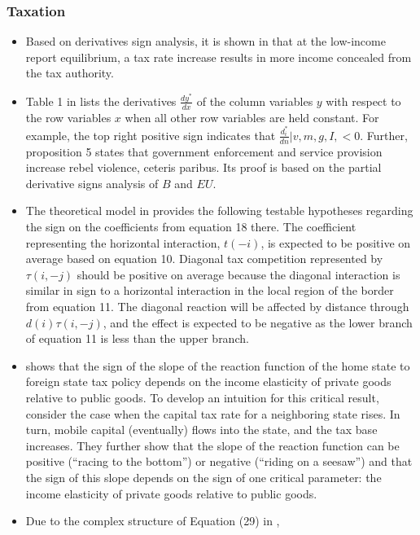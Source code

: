 \documentclass[11pt]{book}
\begin{document}
\subsubsection{Taxation}
\begin{itemize}
\item Based on derivatives sign analysis, it is shown in \cite{panades2004tax}
that at the low-income report equilibrium, a tax rate increase results
in more income concealed from the tax authority.
\item Table 1 in \cite{berman2013predation}
lists the derivatives $\frac{dy^{*}}{dx}$ of the column variables
$y$ with respect to the row variables $x$ when all other row variables
are held constant. For example, the top right positive sign indicates
that $\frac{d_{i}^{*}}{dn}|v,m,g,I,<0$. Further, proposition 5 states
that government enforcement and service provision increase rebel violence,
ceteris paribus. Its proof is based on the partial derivative signs
analysis of $B$ and $EU$.
\item The theoretical model in \cite{agrawal2015inter}
provides the following testable hypotheses regarding the sign on the
coefficients from equation 18 there. The coefficient representing
the horizontal interaction, $t\left(-i\right)$, is expected to be
positive on average based on equation 10. Diagonal tax competition
represented by $\tau\left(i,-j\right)$ should be positive on average
because the diagonal interaction is similar in sign to a horizontal
interaction in the local region of the border from equation 11. The
diagonal reaction will be affected by distance through $d\left(i\right)\tau\left(i,-j\right)$,
and the effect is expected to be negative as the lower branch of equation
11 is less than the upper branch.
\item \cite{chirinko2017tax}
shows that the sign of the slope of the reaction function of the home
state to foreign state tax policy depends on the income elasticity
of private goods relative to public goods. To develop an intuition
for this critical result, consider the case when the capital tax rate
for a neighboring state rises. In turn, mobile capital (eventually)
flows into the state, and the tax base increases. They further show
that the slope of the reaction function can be positive (\textquotedblleft racing
to the bottom\textquotedblright ) or negative (\textquotedblleft riding
on a seesaw\textquotedblright ) and that the sign of this slope depends
on the sign of one critical parameter: the income elasticity of private
goods relative to public goods.
\item Due to the complex structure of Equation (29) in \cite{krenn2017impact},

\end{itemize}
\end{document}
